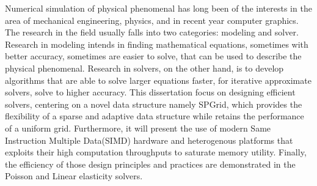 Numerical simulation of physical phenomenal has long been of the interests in the area of mechanical engineering, physics, and in recent year computer graphics. The research in the field usually falls into two categories: modeling and solver. Research in modeling intends in finding mathematical equations, sometimes with better accuracy, sometimes are easier to solve, that can be used to describe the physical phenomenal. Research in solvers, on the other hand, is to develop algorithms that are able to solve larger equations faster, for iterative approximate solvers, solve to higher accuracy.  This dissertation focus on designing efficient solvers, centering on a novel data structure namely SPGrid, which provides the flexibility of a sparse and adaptive data structure while retains the performance of a uniform grid. Furthermore, it will present the use of modern Same Instruction Multiple Data(SIMD) hardware and heterogenous platforms that exploits their high computation throughputs to saturate memory utility. Finally, the efficiency of those design principles and practices are demonstrated in the Poisson and Linear elasticity solvers.